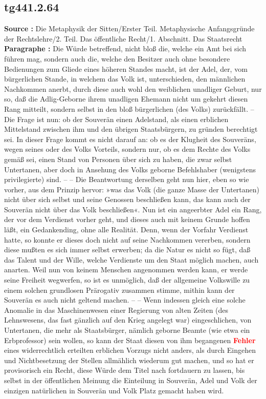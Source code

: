 \documentclass[a4paper,12pt,twoside]{book}
\newcommand{\match}[1]{\textcolor{red}{\textbf{#1}}}
\begin{document}
	\subsection*{tg441.2.64} 
	\textbf{Source : }Die Metaphysik der Sitten/Erster Teil. Metaphysische Anfangsgründe der Rechtslehre/2. Teil. Das öffentliche Recht/1. Abschnitt. Das Staatsrecht\\  
	
	\textbf{Paragraphe : }Die Würde betreffend, nicht bloß die, welche ein Amt bei sich führen mag, sondern auch die, welche den Besitzer auch ohne besondere Bedienungen zum Gliede eines höheren Standes macht, ist der Adel, der, vom bürgerlichen Stande, in welchem das Volk ist, unterschieden, den männlichen  Nachkommen anerbt, durch diese auch wohl den weiblichen unadliger Geburt, nur so, daß die Adlig-Geborne ihrem unadligen Ehemann nicht um gekehrt diesen Rang mitteilt, sondern selbst in den bloß bürgerlichen (des Volks) zurückfällt. – Die Frage ist nun: ob der Souverän einen Adelstand, als einen erblichen Mittelstand zwischen ihm und den übrigen Staatsbürgern, zu gründen berechtigt sei. In dieser Frage kommt es nicht darauf an: ob es der Klugheit des Souveräns, wegen seines oder des Volks Vorteils, sondern nur, ob es dem Rechte des Volks gemäß sei, einen Stand von Personen über sich zu haben, die zwar selbst Untertanen, aber doch in Ansehung des Volks geborne Befehlshaber (wenigstens privilegierte) sind. – – Die Beantwortung derselben geht nun hier, eben so wie vorher, aus dem Prinzip hervor: »was das Volk (die ganze Masse der Untertanen) nicht über sich selbst und seine Genossen beschließen kann, das kann auch der Souverän nicht über das Volk beschließen«. Nun ist ein angeerbter Adel ein Rang, der vor dem Verdienst vorher geht, und dieses auch mit keinem Grunde hoffen läßt, ein Gedankending, ohne alle Realität. Denn, wenn der Vorfahr Verdienst hatte, so konnte er dieses doch nicht auf seine Nachkommen vererben, sondern diese mußten es sich immer selbst erwerben; da die Natur es nicht so fügt, daß das Talent und der Wille, welche Verdienste um den Staat möglich machen, auch anarten. Weil nun von keinem Menschen angenommen werden kann, er werde seine Freiheit wegwerfen, so ist es unmöglich, daß der allgemeine Volkswille zu einem solchen grundlosen Prärogativ zusammen stimme, mithin kann der Souverän es auch nicht geltend machen. – – Wenn indessen gleich eine solche Anomalie in das Maschinenwesen einer Regierung von alten Zeiten (des Lehnswesens, das fast gänzlich auf den Krieg angelegt war) eingeschlichen, von Untertanen, die mehr als Staatsbürger, nämlich geborne Beamte (wie etwa ein Erbprofessor) sein wollen, so kann der Staat diesen von ihm begangenen \match{Fehler} eines widerrechtlich erteilten erblichen Vorzugs nicht anders, als durch Eingehen und Nichtbesetzung der Stellen allmählich wiederum gut machen, und  so hat er provisorisch ein Recht, diese Würde dem Titel nach fortdauern zu lassen, bis selbst in der öffentlichen Meinung die Einteilung in Souverän, Adel und Volk der einzigen natürlichen in Souverän und Volk Platz gemacht haben wird. 
	
\end{document}
